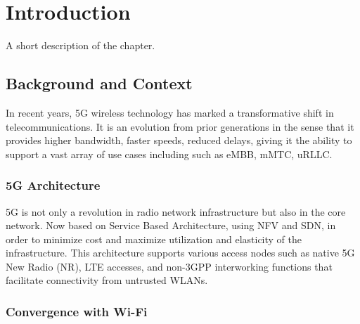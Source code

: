 \chapter{Introduction}%
\label{chapter:introduction}

\begin{introduction}
A short description of the chapter.
\end{introduction}

\section{Background and Context}


In recent years, \ac{5G} wireless technology has marked a transformative shift in telecommunications. It is an evolution from prior generations in the sense that it provides higher bandwidth, faster speeds, reduced delays, giving it the ability to support a vast array of use cases including such as \ac{eMBB}, \ac{mMTC}, \ac{uRLLC}.

\subsection{5G Architecture}


5G is not only a revolution in radio network infrastructure but also in the core network. Now based on Service Based Architecture, using \ac{NFV} and \ac{SDN}, in order to minimize cost and maximize utilization and elasticity of the infrastructure. This architecture supports various access nodes such as native 5G New Radio (NR), LTE accesses, and non-3GPP interworking functions that facilitate connectivity from untrusted WLANs.

\subsection{Convergence with Wi-Fi}

